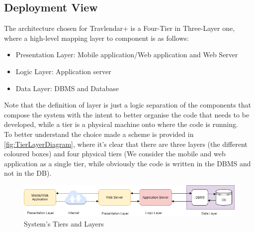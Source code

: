 \subsection{Deployment View}
\label{DeploymentView}
The architecture chosen for Travlendar+ is a Four-Tier in Three-Layer one, where a high-level mapping layer to component is as follows:
\begin{itemize}
\item Presentation Layer: Mobile application/Web application and Web Server
\item Logic Layer: Application server
\item Data Layer: DBMS and Database
\end{itemize}
Note that the definition of layer is just a logic separation of the components that compose the system with the intent to better organise the code that needs to be developed, while a tier is a physical machine onto where the code is running.
\\To better understand the choice made a scheme is provided in \autoref{fig:TierLayerDiagram}, where it's clear that there are three layers (the different coloured boxes) and four physical tiers (We consider the mobile and web application as a single tier, while obviously the code is written in the DBMS and not in the DB).
\begin{figure}[h]
\includegraphics[width = \textwidth, keepaspectratio = true]{Img/TierLayerDiagram}
	\caption{System's Tiers and Layers}
	\label{fig:TierLayerDiagram}
\end{figure}
